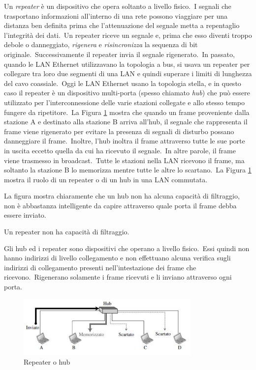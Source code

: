 Un \emph{repeater} è un dispositivo che opera soltanto a livello fisico.\
I segnali che trasportano informazioni all'interno di una rete possono viaggiare per una distanza ben definita prima che l'attenuazione del segnale metta a repentaglio l'integrità dei dati.\
Un repeater riceve un segnale e, prima che esso diventi troppo debole o danneggiato, \emph{rigenera} e \emph{risincronizza} la sequenza di bit originale.\
Successivamente il repeater invia il segnale rigenerato.\
In passato, quando le LAN Ethernet utilizzavano la topologia a bus, si usava un repeater per collegare tra loro due segmenti di una LAN e quindi superare i limiti di lunghezza del cavo coassiale.\
Oggi le LAN Ethernet usano la topologia stella, e in questo caso il repeater è un dispositivo multi-porta (spesso chiamato \emph{hub}) che può essere utilizzato per l'interconnessione delle varie stazioni collegate e allo stesso tempo fungere da ripetitore.\
La Figura \ref{fig:Repeater} mostra che quando un frame proveniente dalla stazione A e destinato alla stazione B arriva all'hub, il segnale che rappresenta il frame viene rigenerato per evitare la presenza di segnali di disturbo possano danneggiare il frame.\
Inoltre, l'hub inoltra il frame attraverso tutte le sue porte in uscita eccetto quella da cui ha ricevuto il segnale.\
In altre parole, il frame viene trasmesso in broadcast.\
Tutte le stazioni nella LAN ricevono il frame, ma soltanto la stazione B lo memorizza mentre tutte le altre lo scartano.\
La Figura \ref{fig:Repeater} mostra il ruolo di un repeater o di un hub in una LAN commutata.

La figura mostra chiaramente che un hub non ha alcuna capacità di filtraggio, non è abbastanza intelligente da capire attraverso quale porta il frame debba essere inviato.

\begin{center}
    Un repeater non ha capacità di filtraggio.
\end{center}

Gli hub ed i repeater sono dispositivi che operano a livello fisico.\
Essi quindi non hanno indirizzi di livello collegamento e non effettuano alcuna verifica sugli indirizzi di collegamento presenti nell'intestazione dei frame che ricevono.\
Rigenerano solamente i frame ricevuti e li inviano attraverso ogni porta.

\begin{figure}[H]
    \centering
    \includegraphics[width=0.8\textwidth]{immagini/Repeater.png}
    \caption{Repeater o hub}
    \label{fig:Repeater}
\end{figure}

